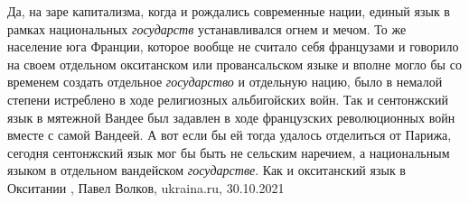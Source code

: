 Да, на заре капитализма, когда и рождались современные нации, единый язык в
рамках национальных \emph{государств} устанавливался огнем и мечом. То же
население юга Франции, которое вообще не считало себя французами и говорило на
своем отдельном окситанском или провансальском языке и вполне могло бы со
временем создать отдельное \emph{государство} и отдельную нацию, было в немалой
степени истреблено в ходе религиозных альбигойских войн.  Так и сентонжский
язык в мятежной Вандее был задавлен в ходе французских революционных войн
вместе с самой Вандеей. А вот если бы ей тогда удалось отделиться от Парижа,
сегодня сентонжский язык мог бы быть не сельским наречием, а национальным
языком в отдельном вандейском \emph{государстве}. Как и окситанский язык в
Окситании
, 
Павел Волков, ukraina.ru, 30.10.2021

